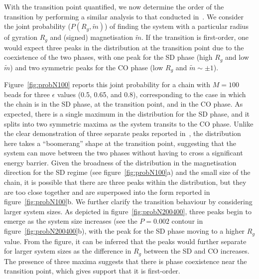 \documentclass[12pt]{article}
\begin{document}
With the transition point quantified, we now determine the order of the transition by performing a similar analysis to that conducted in~\cite{michieletto2016}. We consider the joint probability ($P(R_g,\widetilde{m})$) of finding the system with a particular radius of gyration $R_g$ and (signed) magnetisation $\widetilde{m}$. If the transition is first-order, one would expect three peaks in the distribution at the transition point due to the coexistence of the two phases, with one peak for the SD phase (high $R_g$ and low $\widetilde{m}$) and two symmetric peaks for the CO phase (low $R_g$ and $\widetilde{m} \sim \pm 1$). 

Figure~\ref{fig:probN100} reports this joint probability for a chain with $M = 100$ beads for three $\epsilon$ values (0.5, 0.65, and 0.8), corresponding to the case in which the chain is in the SD phase, at the transition point, and in the CO phase. As expected, there is a single maximum in the distribution for the SD phase, and it splits into two symmetric maxima as the system transits to the CO phase.  Unlike the clear demonstration of three separate peaks reported in~\cite{michieletto2016}, the distribution here takes a ``boomerang'' shape at the transition point, suggesting that the system can move between the two phases without having to cross a significant energy barrier. Given the broadness of the distribution in the magnetisation direction for the SD regime (see figure~\ref{fig:probN100}a) and the small size of the chain, it is possible that there are three peaks within the distribution, but they are too close together and are superposed into the form reported in figure~\ref{fig:probN100}b. We further clarify the transition behaviour by considering larger system sizes. As depicted in figure~\ref{fig:probN200400}, three peaks begin to emerge as the system size increases (see the $P = 0.002$ contour in figure~\ref{fig:probN200400}b), with the peak for the SD phase moving to a higher $R_g$ value. From the figure, it can be inferred that the peaks would further separate for larger system sizes as the difference in $R_g$ between the SD and CO increases. The presence of three maxima suggests that there is phase coexistence near the transition point, which gives support that it is first-order. 
\end{document}
